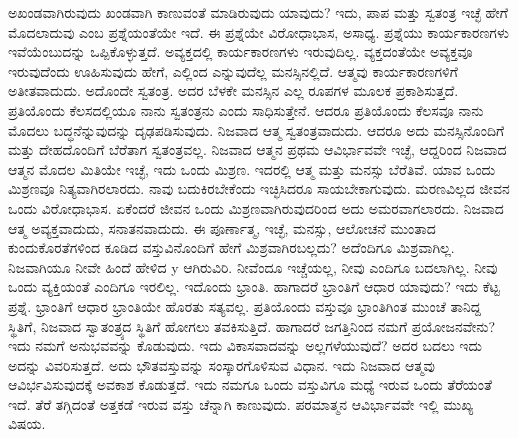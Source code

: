 ಅಖಂಡವಾಗಿರುವುದು ಖಂಡವಾಗಿ ಕಾಣುವಂತೆ ಮಾಡಿರುವುದು ಯಾವುದು? ಇದು, ಪಾಪ ಮತ್ತು ಸ್ವತಂತ್ರ ಇಚ್ಛೆ ಹೇಗೆ ಮೊದಲಾದುವು ಎಂಬ ಪ್ರಶ್ನೆಯಂತೆಯೇ ಇದೆ. ಈ ಪ್ರಶ್ನೆಯೇ ವಿರೋಧಾಭಾಸ, ಅಸಾಧ್ಯ. ಪ್ರಶ್ನೆಯು ಕಾರ್ಯಕಾರಣಗಳು ಇವೆಯೆಂಬುದನ್ನು ಒಪ್ಪಿಕೊಳ್ಳುತ್ತದೆ. ಅವ್ಯಕ್ತದಲ್ಲಿ ಕಾರ್ಯಕಾರಣಗಳು ಇರುವುದಿಲ್ಲ. ವ್ಯಕ್ತದಂತೆಯೇ ಅವ್ಯಕ್ತವೂ ಇರುವುದೆಂದು ಊಹಿಸುವುದು ಹೇಗೆ, ಎಲ್ಲಿಂದ ಎನ್ನುವುದೆಲ್ಲ ಮನಸ್ಸಿನಲ್ಲಿದೆ. ಆತ್ಮವು ಕಾರ್ಯಕಾರಣಗಳಿಗೆ ಅತೀತವಾದುದು. ಅದೊಂದೇ ಸ್ವತಂತ್ರ. ಅದರ ಬೆಳಕೇ ಮನಸ್ಸಿನ ಎಲ್ಲ ರೂಪಗಳ ಮೂಲಕ ಪ್ರಕಾಶಿಸುತ್ತದೆ. ಪ್ರತಿಯೊಂದು ಕೆಲಸದಲ್ಲಿಯೂ ನಾನು ಸ್ವತಂತ್ರನು ಎಂದು ಸಾಧಿಸುತ್ತೇನೆ. ಆದರೂ ಪ್ರತಿಯೊಂದು ಕೆಲಸವೂ ನಾನು ಮೊದಲು ಬದ್ಧನೆನ್ನುವುದನ್ನು ದೃಢಪಡಿಸುವುದು. ನಿಜವಾದ ಆತ್ಮ ಸ್ವತಂತ್ರವಾದುದು. ಆದರೂ ಅದು ಮನಸ್ಸಿನೊಂದಿಗೆ ಮತ್ತು ದೇಹದೊಂದಿಗೆ ಬೆರೆತಾಗ ಸ್ವತಂತ್ರವಲ್ಲ. ನಿಜವಾದ ಆತ್ಮನ ಪ್ರಥಮ ಆವಿರ್ಭಾವವೇ ಇಚ್ಛೆ, ಆದ್ದರಿಂದ ನಿಜವಾದ ಆತ್ಮನ ಮೊದಲ ಮಿತಿಯೇ ಇಚ್ಛೆ, ಇದು ಒಂದು ಮಿಶ್ರಣ. ಇದರಲ್ಲಿ ಆತ್ಮ ಮತ್ತು ಮನಸ್ಸು ಬೆರೆತಿವೆ. ಯಾವ ಒಂದು ಮಿಶ್ರಣವೂ ನಿತ್ಯವಾಗಿರಲಾರದು. ನಾವು ಬದುಕಿರಬೇಕೆಂದು ಇಚ್ಛಿಸಿದರೂ ಸಾಯಬೇಕಾಗುವುದು. ಮರಣವಿಲ್ಲದ ಜೀವನ ಒಂದು ವಿರೋಧಾಭಾಸ. ಏಕೆಂದರೆ ಜೀವನ ಒಂದು ಮಿಶ್ರಣವಾಗಿರುವುದರಿಂದ ಅದು ಅಮರವಾಗಲಾರದು. ನಿಜವಾದ ಆತ್ಮ ಅವ್ಯಕ್ತವಾದುದು, ಸನಾತನವಾದುದು. ಈ ಪೂರ್ಣಾತ್ಮ, ಇಚ್ಛೆ, ಮನಸ್ಸು, ಆಲೋಚನೆ ಮುಂತಾದ ಕುಂದುಕೊರತೆಗಳಿಂದ ಕೂಡಿದ ವಸ್ತುವಿನೊಂದಿಗೆ ಹೇಗೆ ಮಿಶ್ರವಾಗಿರಬಲ್ಲದು? ಅದೆಂದಿಗೂ ಮಿಶ್ರವಾಗಿಲ್ಲ. ನಿಜವಾಗಿಯೂ ನೀವೇ ಹಿಂದೆ ಹೇಳಿದ y ಆಗಿರುವಿರಿ. ನೀವೆಂದೂ ಇಚ್ಚೆಯಲ್ಲ, ನೀವು ಎಂದಿಗೂ ಬದಲಾಗಿಲ್ಲ. ನೀವು ಒಂದು ವ್ಯಕ್ತಿಯಂತೆ ಎಂದಿಗೂ ಇರಲಿಲ್ಲ. ಇದೊಂದು ಭ್ರಾಂತಿ. ಹಾಗಾದರೆ ಭ್ರಾಂತಿಗೆ ಆಧಾರ ಯಾವುದು? ಇದು ಕೆಟ್ಟ ಪ್ರಶ್ನೆ. ಭ್ರಾಂತಿಗೆ ಆಧಾರ ಭ್ರಾಂತಿಯೇ ಹೊರತು ಸತ್ಯವಲ್ಲ. ಪ್ರತಿಯೊಂದು ವಸ್ತುವೂ ಭ್ರಾಂತಿಗಿಂತ ಮುಂಚೆ ತಾನಿದ್ದ ಸ್ಥಿತಿಗೆ, ನಿಜವಾದ ಸ್ವಾತಂತ್ರ್ಯದ ಸ್ಥಿತಿಗೆ ಹೋಗಲು ತವಕಿಸುತ್ತಿದೆ. ಹಾಗಾದರೆ ಜಗತ್ತಿನಿಂದ ನಮಗೆ ಪ್ರಯೋಜನವೇನು? ಇದು ನಮಗೆ ಅನುಭವವನ್ನು ಕೊಡುವುದು. ಇದು ವಿಕಾಸವಾದವನ್ನು ಅಲ್ಲಗಳೆಯುವುದೆ? ಅದರ ಬದಲು ಇದು ಅದನ್ನು ವಿವರಿಸುತ್ತದೆ. ಅದು ಭೌತವಸ್ತುವನ್ನು ಸಂಸ್ಕಾರಗೊಳಿಸುವ ವಿಧಾನ. ಇದು ನಿಜವಾದ ಆತ್ಮವು ಆವಿರ್ಭವಿಸುವುದಕ್ಕೆ ಅವಕಾಶ ಕೊಡುತ್ತದೆ. ಇದು ನಮಗೂ ಒಂದು ವಸ್ತುವಿಗೂ ಮಧ್ಯೆ ಇರುವ ಒಂದು ತೆರೆಯಂತೆ ಇದೆ. ತೆರೆ ತಗ್ಗಿದಂತೆ ಅತ್ತಕಡೆ ಇರುವ ವಸ್ತು ಚೆನ್ನಾಗಿ ಕಾಣುವುದು. ಪರಮಾತ್ಮನ ಆವಿರ್ಭಾವವೇ ಇಲ್ಲಿ ಮುಖ್ಯ ವಿಷಯ.

